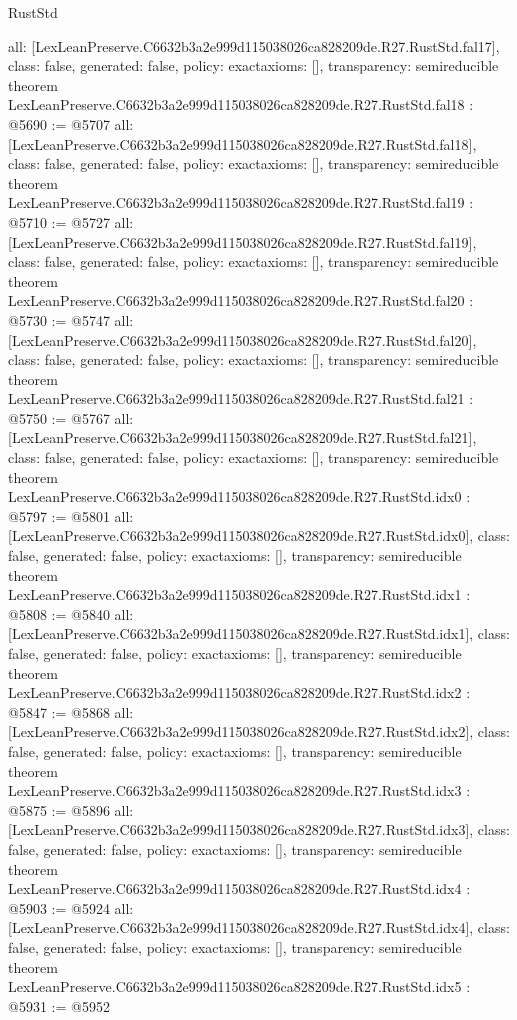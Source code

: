 \begin{lexlean}{RustStd}
\begin{coremodule}
{  all: [LexLeanPreserve.C6632b3a2e999d115038026ca828209de.R27.RustStd.fal17],
  class: false,
  generated: false,
  policy: exact{axioms: []},
  transparency: semireducible
}
theorem LexLeanPreserve.C6632b3a2e999d115038026ca828209de.R27.RustStd.fal18 : @5690 := @5707 {
  all: [LexLeanPreserve.C6632b3a2e999d115038026ca828209de.R27.RustStd.fal18],
  class: false,
  generated: false,
  policy: exact{axioms: []},
  transparency: semireducible
}
theorem LexLeanPreserve.C6632b3a2e999d115038026ca828209de.R27.RustStd.fal19 : @5710 := @5727 {
  all: [LexLeanPreserve.C6632b3a2e999d115038026ca828209de.R27.RustStd.fal19],
  class: false,
  generated: false,
  policy: exact{axioms: []},
  transparency: semireducible
}
theorem LexLeanPreserve.C6632b3a2e999d115038026ca828209de.R27.RustStd.fal20 : @5730 := @5747 {
  all: [LexLeanPreserve.C6632b3a2e999d115038026ca828209de.R27.RustStd.fal20],
  class: false,
  generated: false,
  policy: exact{axioms: []},
  transparency: semireducible
}
theorem LexLeanPreserve.C6632b3a2e999d115038026ca828209de.R27.RustStd.fal21 : @5750 := @5767 {
  all: [LexLeanPreserve.C6632b3a2e999d115038026ca828209de.R27.RustStd.fal21],
  class: false,
  generated: false,
  policy: exact{axioms: []},
  transparency: semireducible
}
theorem LexLeanPreserve.C6632b3a2e999d115038026ca828209de.R27.RustStd.idx0 : @5797 := @5801 {
  all: [LexLeanPreserve.C6632b3a2e999d115038026ca828209de.R27.RustStd.idx0],
  class: false,
  generated: false,
  policy: exact{axioms: []},
  transparency: semireducible
}
theorem LexLeanPreserve.C6632b3a2e999d115038026ca828209de.R27.RustStd.idx1 : @5808 := @5840 {
  all: [LexLeanPreserve.C6632b3a2e999d115038026ca828209de.R27.RustStd.idx1],
  class: false,
  generated: false,
  policy: exact{axioms: []},
  transparency: semireducible
}
theorem LexLeanPreserve.C6632b3a2e999d115038026ca828209de.R27.RustStd.idx2 : @5847 := @5868 {
  all: [LexLeanPreserve.C6632b3a2e999d115038026ca828209de.R27.RustStd.idx2],
  class: false,
  generated: false,
  policy: exact{axioms: []},
  transparency: semireducible
}
theorem LexLeanPreserve.C6632b3a2e999d115038026ca828209de.R27.RustStd.idx3 : @5875 := @5896 {
  all: [LexLeanPreserve.C6632b3a2e999d115038026ca828209de.R27.RustStd.idx3],
  class: false,
  generated: false,
  policy: exact{axioms: []},
  transparency: semireducible
}
theorem LexLeanPreserve.C6632b3a2e999d115038026ca828209de.R27.RustStd.idx4 : @5903 := @5924 {
  all: [LexLeanPreserve.C6632b3a2e999d115038026ca828209de.R27.RustStd.idx4],
  class: false,
  generated: false,
  policy: exact{axioms: []},
  transparency: semireducible
}
theorem LexLeanPreserve.C6632b3a2e999d115038026ca828209de.R27.RustStd.idx5 : @5931 := @5952 {
}
\end{coremodule}
\end{lexlean}
